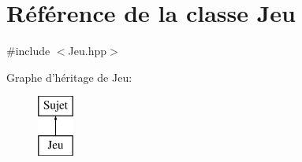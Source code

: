 \hypertarget{class_jeu}{\section{\-Référence de la classe \-Jeu}
\label{class_jeu}
}


{\ttfamily \#include $<$\-Jeu.\-hpp$>$}

\-Graphe d'héritage de \-Jeu\-:\begin{figure}[H]
\begin{center}
\leavevmode
\includegraphics[height=2.000000cm]{class_jeu}
\end{center}
\end{figure}
